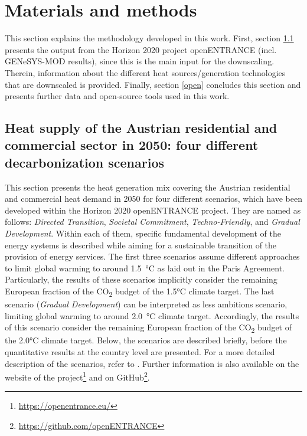 \newpage
\section{Materials and methods}\label{methodology}
This section explains the methodology developed in this work. First, section \ref{res:1} presents the output from the Horizon 2020 project openENTRANCE (incl. GENeSYS-MOD results), since this is the main input for the downscaling. Therein, information about the different heat sources/generation technologies that are downscaled is provided.  Finally, section \ref{open} concludes this section and presents further data and open-source tools used in this work.

\subsection{Heat supply of the Austrian residential and commercial sector in 2050: four different decarbonization scenarios}\label{res:1}
This section presents the heat generation mix covering the Austrian residential and commercial heat demand in 2050 for four different scenarios, which have been developed within the Horizon 2020 openENTRANCE project. They are named as follows: \textit{Directed Transition}, \textit{Societal Commitment}, \textit{Techno-Friendly}, and \textit{Gradual Development}. Within each of them, specific fundamental development of the energy systems is described while aiming for a sustainable transition of the provision of energy services. The first three scenarios assume different approaches to limit global warming to around \SI{1.5}{\degreeCelsius} as laid out in the Paris Agreement. Particularly, the results of these scenarios implicitly consider the remaining European fraction of the CO\textsubscript{2} budget of the 1.5°C climate target. The last scenario (\textit{Gradual Development}) can be interpreted as less ambitions scenario, limiting global warming to around \SI{2.0}{\degreeCelsius} climate target. Accordingly, the results of this scenario consider the remaining European fraction of the CO\textsubscript{2} budget of the 2.0°C climate target. Below, the scenarios are described briefly, before the quantitative results at the country level are presented. For a more detailed description of the scenarios, refer to \cite{auer2020quantitative, auer2020development, hainsch2022energy}. Further information is also available on the website of the project\footnote{\url{https://openentrance.eu/}} and on GitHub\footnote{\url{https://github.com/openENTRANCE}}.\vspace{0.3cm}

